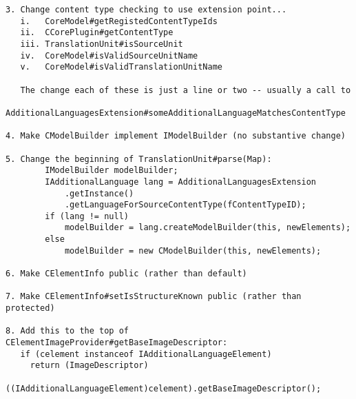 \begin{verbatim}
3. Change content type checking to use extension point...
   i.   CoreModel#getRegistedContentTypeIds
   ii.  CCorePlugin#getContentType
   iii. TranslationUnit#isSourceUnit
   iv.  CoreModel#isValidSourceUnitName
   v.   CoreModel#isValidTranslationUnitName

   The change each of these is just a line or two -- usually a call to
   AdditionalLanguagesExtension#someAdditionalLanguageMatchesContentType

4. Make CModelBuilder implement IModelBuilder (no substantive change)

5. Change the beginning of TranslationUnit#parse(Map):
        IModelBuilder modelBuilder;
        IAdditionalLanguage lang = AdditionalLanguagesExtension
            .getInstance()
            .getLanguageForSourceContentType(fContentTypeID);
        if (lang != null)
            modelBuilder = lang.createModelBuilder(this, newElements);
        else
            modelBuilder = new CModelBuilder(this, newElements);

6. Make CElementInfo public (rather than default)

7. Make CElementInfo#setIsStructureKnown public (rather than protected)

8. Add this to the top of CElementImageProvider#getBaseImageDescriptor:
   if (celement instanceof IAdditionalLanguageElement)
     return (ImageDescriptor)
       ((IAdditionalLanguageElement)celement).getBaseImageDescriptor();
\end{verbatim}
